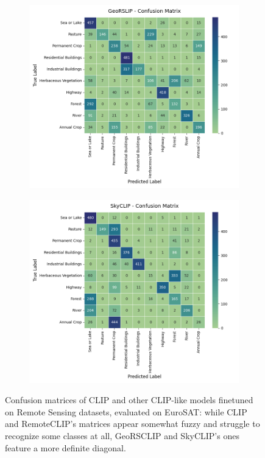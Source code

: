 \documentclass[a4paper, oneside, english]{sapthesis}
\begin{document}
\begin{figure}[h]
  \medskip

  \begin{subfigure}[t]{.5\textwidth}
    \centering
    \includegraphics[width=\linewidth]{img/EuroSAT_GeoRSCLIP_32_cm.png}
  \end{subfigure}
  \hfill
  \begin{subfigure}[t]{.5\textwidth}
    \centering
    \includegraphics[width=\linewidth]{img/EuroSAT_SkyCLIP_32_cm.png}
  \end{subfigure}
  \caption{Confusion matrices of CLIP and other CLIP-like models finetuned on Remote Sensing datasets, evaluated on EuroSAT: while CLIP and RemoteCLIP's matrices appear somewhat fuzzy and struggle to recognize some classes at all, GeoRSCLIP and SkyCLIP's ones feature a more definite diagonal.}
\end{figure}
\end{document}
